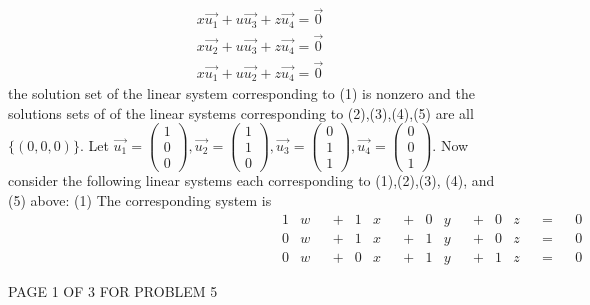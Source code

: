 \documentclass[12pt]{article}
\newenvironment{problem}[2][Problem]
{
	\begin{trivlist} 
		\item[\hskip \labelsep {\bfseries #1 #2:}]
	}
{
	\end{trivlist}
	}
\newenvironment{solution}[1][Solution]
{
	\begin{trivlist} 
		\item[\hskip \labelsep {\itshape #1:}]
	}
	{
	\end{trivlist}
}
\begin{document}
\begin{problem}{5}
\begin{solution}
\begin{align}
x\vec{u_1}+u\vec{u_3}+z\vec{u_4} = \vec{0}\\
x\vec{u_2}+u\vec{u_3}+z\vec{u_4} = \vec{0}\\
x\vec{u_1}+u\vec{u_2}+z\vec{u_4} = \vec{0}
\end{align}
the solution set of the linear system corresponding to (1) is nonzero and the solutions sets of of the linear systems corresponding to (2),(3),(4),(5) are all $\{(0,0,0)\}$.
 Let $\vec{u_1}=\begin{pmatrix}1\\0\\0\end{pmatrix}, \vec{u_2} = \begin{pmatrix} 1\\1\\0\end{pmatrix}, \vec{u_3} = \begin{pmatrix}0\\1\\1\end{pmatrix}, \vec{u_4} = \begin{pmatrix}0\\0\\1\end{pmatrix}$. Now consider the following linear systems each corresponding to (1),(2),(3), (4), and (5) above:
\newline
\newline
\noindent
(1)
 The corresponding system is
 \begin{align*}
&&&&&&&& &&&&&&&& &&&&&&&& 1&w& &+& 1&x& &+& 0&y& &+& 0&z& &=& &0& &&&&&&&& &&&&&&&& &&&&&&&&\\
&&&&&&&& &&&&&&&& &&&&&&&& 0&w& &+& 1&x& &+& 1&y& &+& 0&z& &=& &0& &&&&&&&& &&&&&&&& &&&&&&&&\\
&&&&&&&& &&&&&&&& &&&&&&&& 0&w& &+& 0&x& &+& 1&y& &+& 1&z& &=& &0& &&&&&&&& &&&&&&&& &&&&&&&&
\end{align*}
\end{solution}
\vfill
\centerline{PAGE 1 OF 3 FOR PROBLEM 5}
\end{problem}
\end{document}
